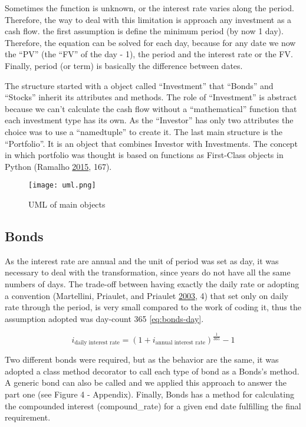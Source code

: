 \documentclass[
  11pt,
]{article}
\begin{document}
Sometimes the function is unknown, or the interest rate varies along the period. Therefore, the way to deal with this limitation is approach any investment as a cash flow. the first assumption is define the minimum period (by now 1 day). Therefore, the equation can be solved for each day, because for any date we now the ``PV'' (the ``FV'' of the day - 1), the period and the interest rate or the FV. Finally, period (or term) is basically the difference between dates.

The structure started with a object called ``Investment'' that ``Bonds'' and ``Stocks'' inherit its attributes and methods. The role of ``Investment'' is abstract because we can't calculate the cash flow without a ``mathematical'' function that each investment type has its own. As the ``Investor'' has only two attributes the choice was to use a ``namedtuple'' to create it. The last main structure is the ``Portfolio''. It is an object that combines Investor with Investments. The concept in which portfolio was thought is based on functions as First-Class objects in Python (Ramalho \protect\hyperlink{ref-fpy}{2015}, 167).

\begin{figure}
\centering
\texttt{[image: uml.png]}
\caption{UML of main objects}
\end{figure}

\hypertarget{bonds}{%
\subsection{Bonds}\label{bonds}}

As the interest rate are annual and the unit of period was set as day, it was necessary to deal with the transformation, since years do not have all the same numbers of days. The trade-off between having exactly the daily rate or adopting a convention (Martellini, Priaulet, and Priaulet \protect\hyperlink{ref-secur}{2003}, 4) that set only on daily rate through the period, is very small compared to the work of coding it, thus the assumption adopted was day-count 365 \eqref{eq:bonds-day}.

\begin{equation}
i_{\text{daily interest rate}}=(1+i_{\text{annual interest rate}})^{\frac{1}{365}}-1
\label{eq:bonds-day}
\end{equation}

Two different bonds were required, but as the behavior are the same, it was adopted a class method decorator to call each type of bond as a Bonds's method. A generic bond can also be called and we applied this approach to answer the part one (see Figure 4 - Appendix). Finally, Bonds has a method for calculating the compounded interest (compound\_rate) for a given end date fulfilling the final requirement.
\end{document}
